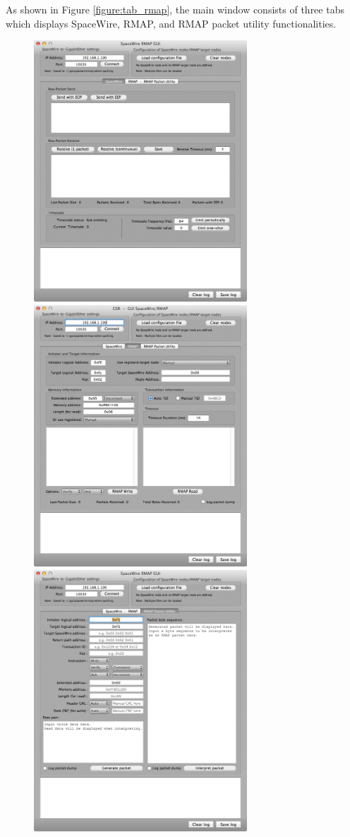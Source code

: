 \documentclass[a4paper,10pt]{article}
\begin{document}
As shown in Figure \ref{figure:tab_rmap}, the main window consists of three tabs which displays SpaceWire, RMAP, and RMAP packet utility functionalities.
\begin{figure}[htb]
\includegraphics[width=8cm]{figures/SpaceWireRMAPGUI/Screenshot_Tab_SpaceWire.png}
\includegraphics[width=8cm]{figures/SpaceWireRMAPGUI/Screenshot_Tab_RMAP.png}
\includegraphics[width=8cm]{figures/SpaceWireRMAPGUI/Screenshot_Tab_RMAPPacketUtility.png}

\end{figure}
\end{document}
